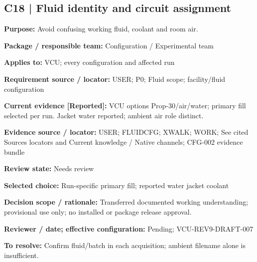 \documentclass[11pt]{article}
\begin{document}
\par\noindent\begin{minipage}{\textwidth}\small\setlength{\parskip}{2pt}
\subsection*{C18 | Fluid identity and circuit assignment}
\textbf{Purpose:} Avoid confusing working fluid, coolant and room air.\par
\textbf{Package / responsible team:} Configuration / Experimental team\par
\textbf{Applies to:} VCU; every configuration and affected run\par
\textbf{Requirement source / locator:} USER; P0; Fluid scope; facility/fluid configuration\par
\textbf{Current evidence [Reported]:} VCU options Prop-30/air/water; primary fill selected per run. Jacket water reported; ambient air role distinct.\par
\textbf{Evidence source / locator:} USER; FLUIDCFG; XWALK; WORK; See cited Sources locators and Current knowledge / Native channels; CFG-002 evidence bundle\par
\textbf{Review state:} Needs review\par
\textbf{Selected choice:} Run-specific primary fill; reported water jacket coolant\par
\textbf{Decision scope / rationale:} Transferred documented working understanding; provisional use only; no installed or package release approval.\par
\textbf{Reviewer / date; effective configuration:} Pending; VCU-REV9-DRAFT-007\par
\textbf{To resolve:} Confirm fluid/batch in each acquisition; ambient filename alone is insufficient.\par
\end{minipage}\par\vspace{5pt}
\end{document}
